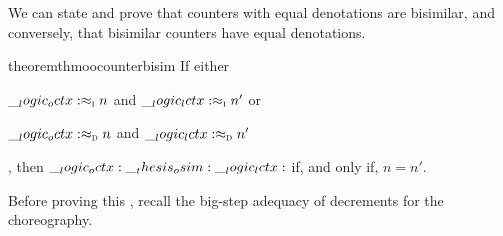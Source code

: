 
We can state and prove that counters with equal denotations are bisimilar, and conversely, that bisimilar counters have equal denotations.
\begin{restatable*}[
  label=thm:oo-counter-bisim
]{theorem}{thmoocounterbisim}
  If either
  \begin{enumerate*}[label=\emph{(\roman*)}]
  \item $\__logic_octx: \approx\sb{\text{\normalfont\scshape i}} n$ and $\__logic_lctx: \approx\sb{\text{\normalfont\scshape i}} n'$ or
  \item $\__logic_octx: \approx\sb{\text{\normalfont\scshape d}} n$ and $\__logic_lctx: \approx\sb{\text{\normalfont\scshape d}} n'$
  \end{enumerate*}, then $\__logic_octx: \__thesis_osim: \__logic_lctx:$ if, and only if, $n = n'$.
\end{restatable*}

Before proving this , recall the big-step adequacy of decrements for the choreography.
\coroocounteradequacy*

